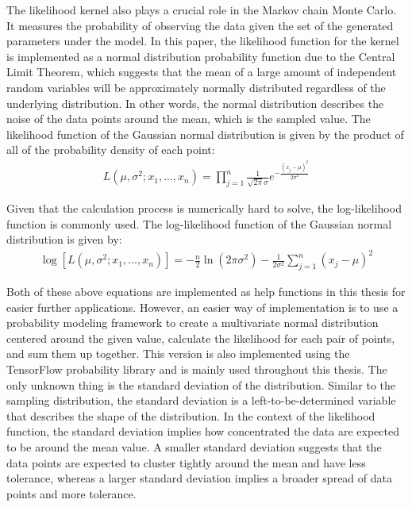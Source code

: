 The likelihood kernel also plays a crucial role in the Markov chain Monte Carlo. It measures the probability of observing the data given the set of the generated parameters under the model.\cite{likelihood_general} In this paper, the likelihood function for the kernel is implemented as a normal distribution probability function due to the Central Limit Theorem, which suggests that the mean of a large amount of independent random variables will be approximately normally distributed regardless of the underlying distribution.\cite{central_limit_theorem} In other words, the normal distribution describes the noise of the data points around the mean, which is the sampled value. The likelihood function of the Gaussian normal distribution is given by the product of all of the probability density of each point:\cite{gaussian_likelihood}
\begin{align}
    L(\mu, \sigma^2; x_1, ..., x_n) = \prod_{j=1}^n \frac{1}{\sqrt{2\pi}\sigma} e^{-\frac{(x_j-\mu)^2}{2\sigma^2}}
\end{align}

Given that the calculation process is numerically hard to solve, the log-likelihood function is commonly used.\cite{log_likelihood} The log-likelihood function of the Gaussian normal distribution is given by:\cite{log_gaussian_likelihood}
\begin{align}
    \log[L(\mu, \sigma^2; x_1, ..., x_n)] = -\frac n 2\ln(2\pi\sigma^2) - \frac 1 {2\sigma^2}\sum_{j=1}^n (x_j - \mu)^2
\end{align}
 
Both of these above equations are implemented as help functions in this thesis for easier further applications. However, an easier way of implementation is to use a probability modeling framework to create a multivariate normal distribution centered around the given value, calculate the likelihood for each pair of points, and sum them up together. This version is also implemented using the TensorFlow probability library and is mainly used throughout this thesis. The only unknown thing is the standard deviation of the distribution. Similar to the sampling distribution, the standard deviation is a left-to-be-determined variable that describes the shape of the distribution. In the context of the likelihood function, the standard deviation implies how concentrated the data are expected to be around the mean value.\cite{standard_deviation_estimation} A smaller standard deviation suggests that the data points are expected to cluster tightly around the mean and have less tolerance, whereas a larger standard deviation implies a broader spread of data points and more tolerance. 

